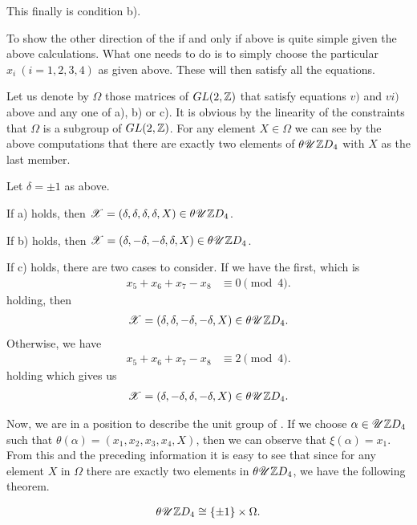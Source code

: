 \documentclass[11pt]{report}
\begin{document}
This finally is condition b).

To show the other direction of the if and only if above is quite 
simple given the above calculations. What one needs to do is to simply choose the 
particular $x_i\ (i=1,2,3,4)$ as given
above. These will then satisfy all the equations.

Let us denote by $\Omega$ those matrices of $GL(2, \mathbb{Z})$ that satisfy 
equations $v)$ and $vi)$ above
and any one of a), b) or c). It is obvious by the linearity of 
the constraints that $\Omega$ is a
subgroup of $GL(2, \mathbb{Z})$. For any element $X \in \Omega$ we can see by the 
above computations that there
are exactly two elements of $\theta\mathscr{U}{ \mathbb{Z}D_4}$ with $X$ as the last member.

Let $\delta=\pm 1$ as above.

If a) holds, then $\mathscr{X}=(\delta,\delta,\delta,\delta,X) \in \theta\mathscr{U}{ \mathbb{Z}D_4}$.


If b) holds, then $\mathscr{X}=(\delta,-\delta,-\delta,\delta,X) \in \theta\mathscr{U}{ \mathbb{Z}D_4}$.


If c) holds, there are two cases to consider. If we have the 
first, which is
\begin{align*}
x_5+x_6+x_7-x_8&\equiv 0 \pmod{4}.
\end{align*}
holding, then
\begin{align*}
\mathscr{X}=(\delta,\delta,-\delta,-\delta,X) \in \theta\mathscr{U}{ \mathbb{Z}D_4}.
\end{align*}
Otherwise, we have
\begin{align*}
x_5+x_6+x_7-x_8&\equiv 2 \pmod{4}.
\end{align*}
holding which gives us
\begin{align*}
\mathscr{X}=(\delta,-\delta,\delta,-\delta,X) \in \theta\mathscr{U}{ \mathbb{Z}D_4}.
\end{align*}

Now, we are in a position to describe the unit group of \intdfr{}. If 
we choose $\alpha \in \mathscr{U}{ \mathbb{Z}D_4}$ such that 
 $\theta(\alpha) = (x_1,x_2,x_3,x_4,X)$, then we can observe that 
$\xi(\alpha)=x_1$. From this and the preceding
information it is easy to see that since for any element $X$ in $\Omega$ 
there are exactly two elements
in $\theta\mathscr{U}{ \mathbb{Z}D_4}$, we have the following theorem.

\begin{theorem}
\begin{align*}
\theta\mathscr{U}{ \mathbb{Z}D_4} \cong \{\pm 1\}\times\Omega.
\end{align*}
\end{theorem}
\end{document}
